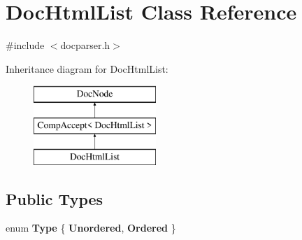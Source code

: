 \hypertarget{class_doc_html_list}{}\section{Doc\+Html\+List Class Reference}
\label{class_doc_html_list}


{\ttfamily \#include $<$docparser.\+h$>$}

Inheritance diagram for Doc\+Html\+List\+:\begin{figure}[H]
\begin{center}
\leavevmode
\includegraphics[height=3.000000cm]{class_doc_html_list}
\end{center}
\end{figure}
\subsection*{Public Types}
\begin{DoxyCompactItemize}
\item 
\mbox{\label{class_doc_html_list_af05523650adffbefb14392d8f9f23487}} 
enum {\bfseries Type} \{ {\bfseries Unordered}, 
{\bfseries Ordered}
 \}
\end{DoxyCompactItemize}

